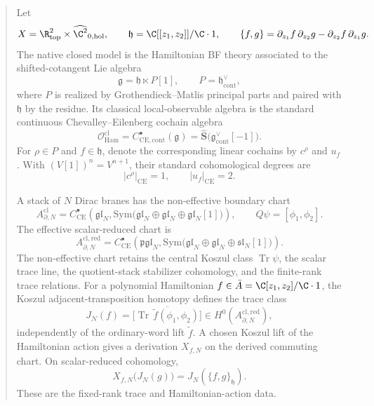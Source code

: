 \begin{abstract}

\noindent
Let
\[
  X=\R^2_{\mathrm{top}}\times\widehat{\C^2}_{0,\mathrm{hol}},
  \qquad
  \mathfrak h=\C[[z_1,z_2]]/\C\cdot1,
  \qquad
  \{f,g\}
  =\partial_{z_1}f\,\partial_{z_2}g
   -\partial_{z_2}f\,\partial_{z_1}g.
\]
The native closed model is the Hamiltonian BF theory associated to the
shifted-cotangent Lie algebra
\[
  \mathfrak g=\mathfrak h\ltimes P[1],
  \qquad
  P=\mathfrak h^\vee_{\mathrm{cont}},
\]
where \(P\) is realized by Grothendieck--Matlis principal parts and paired
with \(\mathfrak h\) by the residue.  Its classical local-observable
algebra is the standard continuous Chevalley--Eilenberg cochain algebra
\[
  \mathcal O^{\mathrm{cl}}_{\mathrm{Ham}}
  =C^\bullet_{\mathrm{CE},\mathrm{cont}}(\mathfrak g)
  =\widehat{\mathbf S}
    \bigl(\mathfrak g^\vee_{\mathrm{cont}}[-1]\bigr).
\]
For \(\rho\in P\) and \(f\in\mathfrak h\), denote the corresponding
linear cochains by \(c^\rho\) and \(u_f\).  With
\((V[1])^n=V^{n+1}\), their standard cohomological degrees are
\[
  |c^\rho|_{\mathrm{CE}}=1,
  \qquad
  |u_f|_{\mathrm{CE}}=2.
\]

\medskip\noindent
A stack of \(N\) Dirac branes has the non-effective boundary chart
\[
  A^{\mathrm{cl}}_{\partial,N}
  =C^\bullet_{\mathrm{CE}}\!\left(
    \mathfrak{gl}_N,
    \mathrm{Sym}\bigl(
      \mathfrak{gl}_N\oplus\mathfrak{gl}_N
      \oplus\mathfrak{gl}_N[1]\bigr)\right),
  \qquad
  Q\psi=[\phi_1,\phi_2].
\]
The effective scalar-reduced chart is
\[
  A^{\mathrm{cl,red}}_{\partial,N}
  =C^\bullet_{\mathrm{CE}}\!\left(
    \mathfrak{pgl}_N,
    \mathrm{Sym}\bigl(
      \mathfrak{gl}_N\oplus\mathfrak{gl}_N
      \oplus\mathfrak{sl}_N[1]\bigr)\right).
\]
The non-effective chart retains the
central Koszul class \(\operatorname{Tr}\psi\), the scalar trace line,
the quotient-stack stabilizer cohomology, and the finite-rank trace
relations.  For a polynomial Hamiltonian
\(f\in\bar A=\C[z_1,z_2]/\C\cdot1\), the Koszul
adjacent-transposition homotopy defines the trace class
\[
  J_N(f)
  =\bigl[\overline{\operatorname{Tr}\,\widetilde f
      (\phi_1,\phi_2)}\bigr]
  \in H^0(A^{\mathrm{cl,red}}_{\partial,N}),
\]
independently of the ordinary-word lift \(\widetilde f\).  A chosen
Koszul lift of the Hamiltonian action gives a derivation \(X_{f,N}\) on
the derived commuting chart.  On scalar-reduced cohomology,
\[
  X_{f,N}\bigl(J_N(g)\bigr)=J_N(\{f,g\}_{\mathfrak h}).
\]
These are the fixed-rank trace and Hamiltonian-action data.


\end{abstract}
